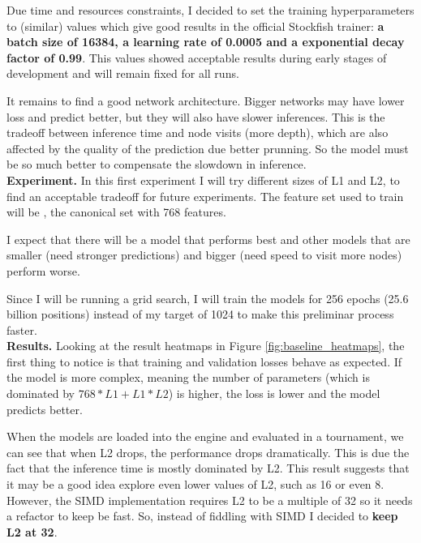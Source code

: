 Due time and resources constraints, I decided to set the training hyperparameters to   (similar) values which give good results in the official Stockfish trainer: \textbf{a batch size of 16384, a learning rate of 0.0005 and a exponential decay factor of 0.99}. This values showed acceptable results during early stages of development and will remain fixed for all runs.

It remains to find a good network architecture. Bigger networks may have lower loss and predict better, but they will also have slower inferences. This is the tradeoff between inference time and node visits (more depth), which are also affected by the quality of the prediction due better prunning. So the model must be so much better to compensate the slowdown in inference. \\

\textbf{Experiment.}  In this first experiment I will try different sizes of L1 and L2,  to find an acceptable tradeoff for future experiments. The feature set used to train will be , the canonical set with 768 features.

I expect that there will be a model that performs best and other models that are smaller (need stronger predictions) and bigger (need speed to visit more nodes) perform worse.

Since I will be running a grid search, I will train the models for 256 epochs (25.6 billion positions) instead of my target of 1024 to make this preliminar process faster. \\

\textbf{Results.} Looking at the result heatmaps in Figure \ref{fig:baseline_heatmaps}, the first thing to notice is that training and validation losses behave as expected. If the model is more complex, meaning the number of parameters (which is dominated by $768*L1+L1*L2$) is higher, the loss is lower and the model predicts better.

When the models are loaded into the engine and evaluated in a tournament, we can see that when L2 drops, the performance drops dramatically. This is due the fact that the inference time is mostly dominated by L2. This result suggests that it may be a good idea explore even lower values of L2, such as 16 or even 8. However, the SIMD implementation requires L2 to be a multiple of 32 so it needs a refactor to keep be fast. So, instead of fiddling with SIMD I decided to \textbf{keep L2 at 32}.

